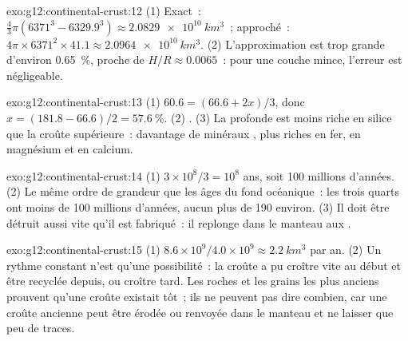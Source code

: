 \begin{solution}{exo:g12:continental-crust:12}
(1) Exact~: $\tfrac{4}{3}\pi(6371^3 - 6329.9^3) \approx
\qty{2.0829e10}{km^3}$~; approché~: $4\pi \times 6371^2 \times 41.1
\approx \qty{2.0964e10}{km^3}$. (2) L'approximation est trop grande
d'environ \qty{0.65}{\percent}, proche de $H/R \approx 0.0065$~: pour une
couche mince, l'erreur est négligeable.
\end{solution}

\begin{solution}{exo:g12:continental-crust:13}
(1) $60.6 = (66.6 + 2x)/3$, donc $x = (181.8 - 66.6)/2 = \qty{57.6}{\percent}$.
(2) . (3) La  profonde est moins riche en
silice que la croûte supérieure~: davantage de minéraux , plus
riches en fer, en magnésium et en calcium.
\end{solution}

\begin{solution}{exo:g12:continental-crust:14}
(1) $3 \times 10^8/3 = 10^8$ ans, soit 100 millions d'années. (2) Le même
ordre de grandeur que les âges du fond océanique~: les trois quarts ont
moins de 100 millions d'années, aucun plus de 190 environ. (3) Il doit être
détruit aussi vite qu'il est fabriqué~: il replonge dans le manteau aux
.
\end{solution}

\begin{solution}{exo:g12:continental-crust:15}
(1) $8.6 \times 10^9 / 4.0 \times 10^9 \approx \qty{2.2}{km^3}$ par an.
(2) Un rythme constant n'est qu'une possibilité~: la croûte a pu croître
vite au début et être recyclée depuis, ou croître tard. Les roches et les
grains les plus anciens prouvent qu'une croûte existait tôt~; ils ne
peuvent pas dire combien, car une croûte ancienne peut être érodée ou
renvoyée dans le manteau et ne laisser que peu de traces.
\end{solution}

